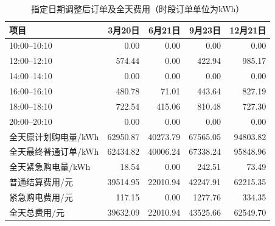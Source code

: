 \begin{table}[!htbp]
\centering
\caption{指定日期调整后订单及全天费用（时段订单单位为kWh）}
\label{tab:q3_final_order}
\small
\setlength{\tabcolsep}{5pt}
\begin{tabular}{lrrrr}
\toprule
项目 & 3月20日 & 6月21日 & 9月23日 & 12月21日 \\
\midrule
10:00--10:10 & 0.00 & 0.00 & 0.00 & 0.00 \\
12:00--12:10 & 574.44 & 0.00 & 422.94 & 985.17 \\
14:00--14:10 & 0.00 & 0.00 & 0.00 & 0.00 \\
16:00--16:10 & 480.78 & 71.01 & 443.64 & 827.19 \\
18:00--18:10 & 722.54 & 415.06 & 810.48 & 727.30 \\
20:00--20:10 & 0.00 & 0.00 & 0.00 & 0.00 \\
\midrule
全天原计划购电量/kWh & 62950.87 & 40273.79 & 67565.05 & 94803.82 \\
全天最终普通订单/kWh & 62434.82 & 40006.24 & 67338.24 & 95848.96 \\
全天紧急购电量/kWh & 18.54 & 0.00 & 242.51 & 73.49 \\
普通结算费用/元 & 39514.95 & 22010.94 & 42247.91 & 62215.35 \\
紧急购电费用/元 & 117.15 & 0.00 & 1277.76 & 334.35 \\
全天总费用/元 & 39632.09 & 22010.94 & 43525.66 & 62549.70 \\
\bottomrule
\end{tabular}
\end{table}

